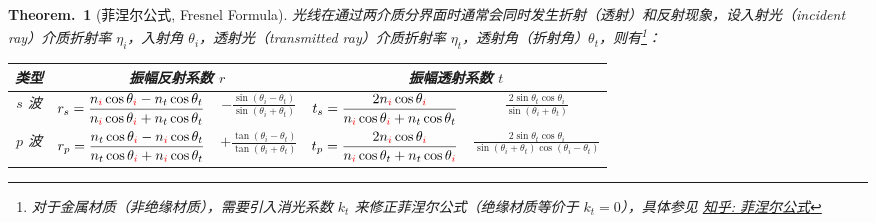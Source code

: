 \documentclass[UTF8]{report}
\theoremstyle{MyLineTheoremStyle} %
\theoremstyle{MyBlockTheoremStyle} %
\newtheorem{BlockTheorem}[LineTheorem]{Theorem.\,} %
\theoremstyle{MySubsubsectionStyle} %
\begin{document}
\begin{BlockTheorem}[菲涅尔公式, Fresnel Formula]\label{菲涅尔公式}
光线在通过两介质分界面时通常会同时发生折射（透射）和反射现象，设入射光（incident ray）介质折射率 $\eta_i$，入射角 $\theta_i$，透射光（transmitted ray）介质折射率 $\eta_t$，透射角（折射角）$\theta_t$，则有\footnote{对于金属材质（非绝缘材质），需要引入消光系数 $k_t$ 来修正菲涅尔公式（绝缘材质等价于 $k_t = 0$），具体参见 \href{https://zhuanlan.zhihu.com/p/480405520?utm_psn=1818236176659771392}{知乎: 菲涅尔公式}}：

%



\begin{table}[H]
\centering
\renewcommand{\arraystretch}{1.6} %
\begin{tabular}{|c|c|c|c|c|} 
\hline
类型 & \multicolumn{2}{c|}{振幅反射系数 $r$} & \multicolumn{2}{c|}{振幅透射系数 $t$ }  \\ 
\hline
$s$ 波 & $\displaystyle r_s = \frac{n_{{\color{red} i}}\cos \theta_{{\color{red} i}} - n_t \cos \theta_t}{n_{{\color{red} i}}\cos \theta_{{\color{red} i}} + n_t \cos \theta_t} $ & $\displaystyle  - \frac{\sin (\theta_i - \theta_t) }{\sin (\theta_i + \theta_t)}$ & $\displaystyle t_s  = \frac{2n_{{\color{red} i}} \cos \theta_{{\color{red} i}}}{n_{{\color{red} i}}\cos \theta_{{\color{red} i}} + n_t \cos \theta_t} $ &   $\displaystyle   \frac{2 \sin \theta_t \cos \theta_i}{\sin (\theta_i + \theta_t)}$   \\ 
\hline
$p$ 波 & $\displaystyle r_p = \frac{n_t\cos \theta_{{\color{red} i}} - n_{{\color{red} i}} \cos \theta_t}{n_t\cos \theta_{{\color{red} i}} + n_{{\color{red} i}} \cos \theta_t} $ &     $ \displaystyle  + \frac{\tan (\theta_i - \theta_t)}{\tan (\theta_i + \theta_t)} $  &  $\displaystyle t_p  = \frac{2n_{{\color{red} i}} \cos \theta_{{\color{red} i}}}{n_{{\color{red} i}}\cos \theta_t + n_t \cos \theta_{{\color{red} i}}} $ &   $\displaystyle \frac{2 \sin \theta_t \cos \theta_i}{\sin (\theta_i + \theta_t) \cos (\theta_i - \theta_t)}$                  \\
\hline
\end{tabular}
\end{table}


\end{BlockTheorem}
\end{document}
